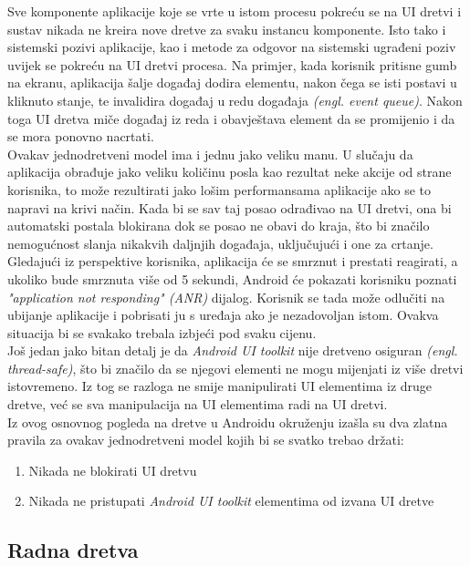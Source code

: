 \documentclass[times, utf8, zavrsni]{fer}
\begin{document}
Sve komponente aplikacije koje se vrte u istom procesu pokreću se na UI dretvi i sustav nikada ne kreira nove dretve za svaku instancu komponente. Isto tako i sistemski pozivi aplikacije, kao i metode za odgovor na sistemski ugrađeni poziv uvijek se pokreću na UI dretvi procesa. Na primjer, kada korisnik pritisne gumb na ekranu, aplikacija šalje događaj dodira elementu, nakon čega se isti postavi u kliknuto stanje, te invalidira događaj u redu događaja \textit{(engl. event queue)}. Nakon toga UI dretva miče događaj iz reda i obavještava element da se promijenio i da se mora ponovno nacrtati.\\

Ovakav jednodretveni model ima i jednu jako veliku manu. U slučaju da aplikacija obrađuje jako veliku količinu posla kao rezultat neke akcije od strane korisnika, to može rezultirati jako lošim performansama aplikacije ako se to napravi na krivi način. Kada bi se sav taj posao odrađivao na UI dretvi, ona bi automatski postala blokirana dok se posao ne obavi do kraja, što bi značilo nemogućnost slanja nikakvih daljnjih događaja, uključujući i one za crtanje. Gledajući iz perspektive korisnika, aplikacija će se smrznut i prestati reagirati, a ukoliko bude smrznuta više od 5 sekundi, Android će pokazati korisniku poznati \textit{"application not responding" (ANR)} dijalog. Korisnik se tada može odlučiti na ubijanje aplikacije i pobrisati ju s uređaja ako je nezadovoljan istom. Ovakva situacija bi se svakako trebala izbjeći pod svaku cijenu.\\

Još jedan jako bitan detalj je da \textit{Android UI toolkit} nije dretveno osiguran \textit{(engl. thread-safe)}, što bi značilo da se njegovi elementi ne mogu mijenjati iz više dretvi istovremeno. Iz tog se razloga ne smije manipulirati UI elementima iz druge dretve, već se sva manipulacija na UI elementima radi na UI dretvi.\\

Iz ovog osnovnog pogleda na dretve u Androidu okruženju izašla su dva zlatna pravila za ovakav jednodretveni model kojih bi se svatko trebao držati:

\begin{enumerate}
\item Nikada ne blokirati UI dretvu
\item Nikada ne pristupati \textit{Android UI toolkit} elementima od izvana UI dretve
\end{enumerate}

\subsection{Radna dretva}
\end{document}
